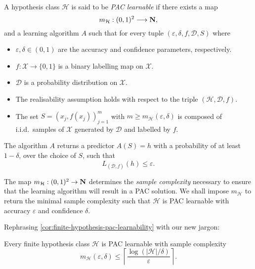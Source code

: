 \begin{definition}
    \label{def:pac-learning}
    A hypothesis class \(\mathcal{H}\) is said to be \emph{PAC learnable} if there
    exists a map
    \[
        m_{\mathcal{H}}: (0, 1)^2 \longrightarrow \mathbf{N},
    \]
    and a learning algorithm \(A\) such that for every tuple
    \((\varepsilon, \delta, f, \mathcal{D}, S)\) where
    \begin{itemize}\setlength\itemsep{0em}
        \item \(\varepsilon, \delta \in (0, 1)\) are the accuracy and confidence
              parameters, respectively.
        \item \(f: \mathcal{X} \to \{0, 1\}\) is a binary labelling map on \(\mathcal{X}\).
        \item \(\mathcal{D}\) is a probability distribution on \(\mathcal{X}\).
        \item The realisability assumption holds with respect to the triple
              \((\mathcal{H}, \mathcal{D}, f)\).
        \item The set \(S = (x_j, f(x_j))_{j=1}^m\) with \(m \geq
              m_{\mathcal{H}}(\varepsilon, \delta)\) is composed of i.i.d.~samples of
              \(\mathcal{X}\) generated by \(\mathcal{D}\) and labelled by \(f\).
    \end{itemize}
    The algorithm \(A\) returns a predictor \(A(S) = h\) with a probability of at
    least \(1 - \delta\), over the choice of \(S\), such that
    \[
        L_{(\mathcal{D}, f)}(h) \leq \varepsilon.
    \]

    The map \(m_{\mathcal{H}}: (0, 1)^2 \to \mathbf{N}\) determines the \emph{sample
        complexity} necessary to ensure that the learning algorithm will result in a
    PAC solution. We shall impose \(m_{\mathcal{H}}\) to return the minimal sample
    complexity such that \(\mathcal{H}\) is PAC learnable with accuracy
    \(\varepsilon\) and confidence \(\delta\).
\end{definition}

Rephrasing \cref{cor:finite-hypothesis-pac-learnability} with our new jargon:

\begin{corollary}
    \label{cor:finite-hypothesis-pac-learnability-succint}
    Every finite hypothesis class \(\mathcal{H}\) is PAC learnable with sample complexity
    \[
        m_{\mathcal{H}}(\varepsilon, \delta) \leq
        \left\lceil \frac{\log(|\mathcal{H}| / \delta)}{\varepsilon} \right\rceil.
    \]
\end{corollary}

